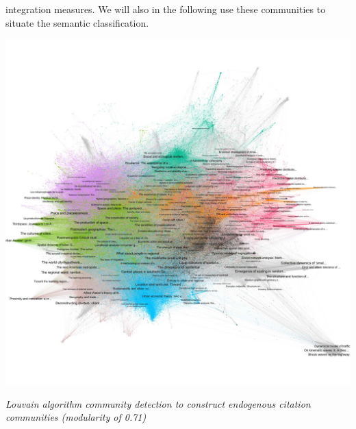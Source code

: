 {integration measures. We will also in the following use these communities to situate the semantic classification.


\begin{center}
\includegraphics[width=\textwidth,height=0.7\textheight,trim=0 0 0 2cm]{figures/scim_Fig5.jpg}
\end{center}

\footnotesize
\textit{Louvain algorithm community detection to construct endogenous citation communities (modularity of 0.71)}

}


